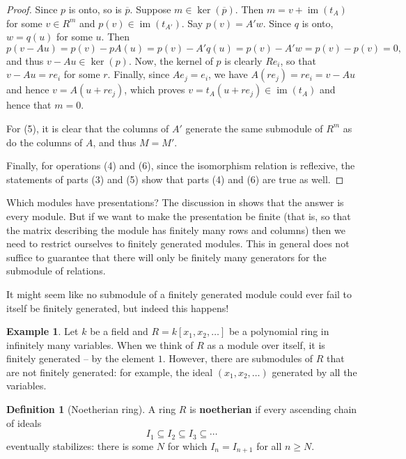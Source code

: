 \documentclass[12pt]{report}
\numberwithin{equation}{section}
\numberwithin{theorem}{chapter}
\theoremstyle{definition}
\newtheorem{definition}[theorem]{Definition}
\newtheorem{example}[theorem]{Example}
\newtheorem*{basic properties}{Basic Properties}
\newtheorem*{Important Remark}{Important Remark}
\renewcommand{\ker}{\operatorname{ker}}
\DeclareMathOperator{\im}{im}
\begin{document}
\begin{proof}
Since $p$ is onto, so is $\overline{p}$. Suppose $m \in \ker(\overline{p})$. Then $m = v + \im(t_A)$ for some $v \in R^m$ and $p(v) \in \im(t_{A'})$. Say $p(v) = A' w$. Since $q$ is onto, $w = q(u)$ for some $u$. Then
$$p(v - Au) = p(v) - pA(u) = p(v) - A'q(u) = p(v) - A'w = p(v) - p(v) = 0,$$
and thus $v - Au \in \ker(p)$. Now, the kernel of $p$ is
clearly $Re_i$, so that $v - Au = re_i$ for some $r$. Finally, since $Ae_j = e_i$, we have $A(re_j) = re_i = v - Au$ and hence $v = A(u + re_j)$, which proves
$v=t_A(u+re_j) \in \im(t_A)$ and hence that  $m = 0$.

For (5), it is clear that the columns of $A'$ generate the same submodule of $R^m$ as do the columns of $A$, and thus $M = M'$.
  
Finally, for operations (4) and (6), since the isomorphism relation is reflexive, the statements of parts (3) and (5) show that parts (4) and (6) are true as well.
\end{proof}

 
Which modules have presentations? The discussion in  shows that the answer is every module. But if we want to make the presentation be finite (that is, so that the matrix describing the module has finitely many rows and columns) then we need to restrict ourselves to finitely generated modules. This in general does not suffice to guarantee that there will only be finitely many generators for the submodule of relations.

It might seem like no submodule of a finitely generated module could ever fail to itself be finitely generated, but indeed this happens! %

\begin{example}
	Let $k$ be a field and $R = k[x_1, x_2, \ldots]$ be a polynomial ring in infinitely many variables. When we think of $R$ as a module over itself, it is finitely generated -- by the element $1$. However, there are submodules of $R$ that are not finitely generated: for example, the ideal $(x_1, x_2, \ldots)$ generated by all the variables.
\end{example}




\begin{definition}[Noetherian ring] 
	A ring $R$ is {\bf noetherian} if every ascending chain of ideals 
	$$I_1 \subseteq I_2 \subseteq I_3 \subseteq \cdots$$
	eventually stabilizes: there is some $N$ for which $I_n=I_{n+1}$ for all $n \geqslant N$.
\end{definition}
\end{document}
